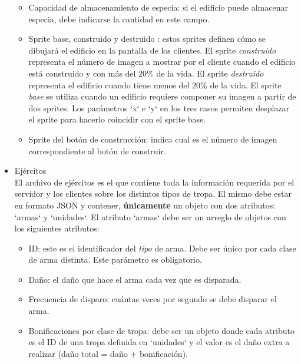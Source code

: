 \documentclass[titlepage,a4paper,12pt]{article}
\begin{document}
\begin{itemize}
\begin{itemize}
\item Capacidad de almacenamiento de especia: si el edificio puede almacenar especia, debe indicarse la cantidad en este campo.

\item Sprite base, construido y destruido : estos sprites definen cómo se dibujará el edificio en la pantalla de los clientes. El sprite \textit{construido} representa el número de imagen a mostrar por el cliente cuando el edificio está construido y con más del 20\% de la vida. El sprite \textit{destruido} representa el edificio cuando tiene menos del 20\% de la vida. El sprite \textit{base} se utiliza cuando un edificio requiere componer su imagen a partir de dos sprites. Los parámetros `x` e `y` en los tres casos permiten desplazar el sprite para hacerlo coincidir con el sprite base.

\item Sprite del botón de construcción: indica cual es el número de imagen correspondiente al botón de construir.

\end{itemize}

\item Ejércitos\\

El archivo de ejércitos es el que contiene toda la información requerida por el servidor y los clientes sobre los distintos tipos de tropa. El mismo debe estar en formato JSON y contener, \textbf{únicamente} un objeto con 
dos atributos: `armas` y `unidades`.  El atributo `armas` debe ser un arreglo de objetos con los siguientes atributos:


\begin{itemize}

\item ID: este es el identificador del \textit{tipo} de arma. Debe ser único por cada clase de arma distinta. Este parámetro es obligatorio.

\item Daño: el daño que hace el arma cada vez que es disparada.


\item Frecuencia de disparo: cuántas veces por segundo se debe disparar el arma.

\item Bonificaciones por clase de tropa: debe ser un objeto donde cada atributo es el ID de una tropa definida en `unidades` y el valor es el daño extra a realizar (daño total = daño + bonificación).


\end{itemize}
\end{itemize}
\end{document}
